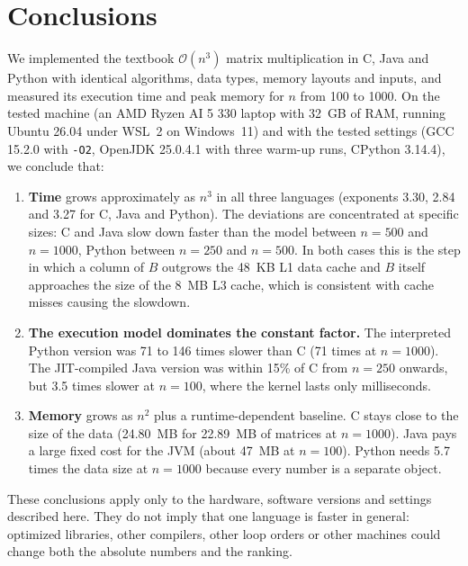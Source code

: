 \documentclass[conference,a4paper]{IEEEtran}
\newcommand{\bigO}[1]{\mathcal{O}\!\left(#1\right)}
\newcommand{\code}[1]{\texttt{#1}}
\begin{document}
\section{Conclusions}
\label{sec:conclusions}
We implemented the textbook $\bigO{n^3}$ matrix multiplication in C, Java and
Python with identical algorithms, data types, memory layouts and inputs, and
measured its execution time and peak memory for $n$ from 100 to 1000. On the
tested machine (an AMD Ryzen AI 5 330 laptop with 32~GB of RAM, running
Ubuntu 26.04 under WSL~2 on Windows~11) and with the tested settings (GCC 15.2.0
with \code{-O2}, OpenJDK 25.0.4.1 with three warm-up runs, CPython 3.14.4), we
conclude that:
\begin{enumerate}[itemsep=1pt]
  \item \textbf{Time} grows approximately as $n^3$ in all three languages
        (exponents 3.30, 2.84 and 3.27 for C, Java and Python). The deviations
        are concentrated at specific sizes: C and Java slow down faster than
        the model between $n=500$ and $n=1000$, Python between $n=250$ and
        $n=500$. In both cases this is the step in which a column of $B$
        outgrows the 48~KB L1 data cache and $B$ itself approaches the size of
        the 8~MB L3 cache, which is consistent with cache misses causing the
        slowdown.
  \item \textbf{The execution model dominates the constant factor.} The
        interpreted Python version was 71 to 146 times slower than C (71 times
        at $n=1000$). The JIT-compiled Java version was within 15\% of C from
        $n=250$ onwards, but 3.5 times slower at $n=100$, where the kernel
        lasts only milliseconds.
  \item \textbf{Memory} grows as $n^2$ plus a runtime-dependent baseline. C
        stays close to the size of the data (24.80~MB for 22.89~MB of matrices
        at $n=1000$). Java pays a large fixed cost for the JVM (about 47~MB at
        $n=100$). Python needs 5.7 times the data size at $n=1000$ because
        every number is a separate object.
\end{enumerate}
These conclusions apply only to the hardware, software versions and settings
described here. They do not imply that one language is faster in general:
optimized libraries, other compilers, other loop orders or other machines could
change both the absolute numbers and the ranking.
\end{document}
